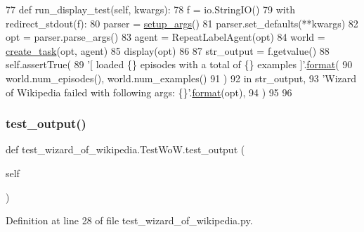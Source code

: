 \begin{DoxyCode}
77     \textcolor{keyword}{def }run\_display\_test(self, kwargs):
78         f = io.StringIO()
79         with redirect\_stdout(f):
80             parser = \hyperlink{namespaceparlai_1_1chat__service_1_1services_1_1messenger_1_1run_a17bafea2534d593de1fbf1e0724e5b67}{setup\_args}()
81             parser.set\_defaults(**kwargs)
82             opt = parser.parse\_args()
83             agent = RepeatLabelAgent(opt)
84             world = \hyperlink{namespaceparlai_1_1core_1_1worlds_a11923c10b545c7ecc1b08fe2242d9c2c}{create\_task}(opt, agent)
85             display(opt)
86 
87         str\_output = f.getvalue()
88         self.assertTrue(
89             \textcolor{stringliteral}{'[ loaded \{\} episodes with a total of \{\} examples ]'}.\hyperlink{namespaceparlai_1_1chat__service_1_1services_1_1messenger_1_1shared__utils_a32e2e2022b824fbaf80c747160b52a76}{format}(
90                 world.num\_episodes(), world.num\_examples()
91             )
92             \textcolor{keywordflow}{in} str\_output,
93             \textcolor{stringliteral}{'Wizard of Wikipedia failed with following args: \{\}'}.\hyperlink{namespaceparlai_1_1chat__service_1_1services_1_1messenger_1_1shared__utils_a32e2e2022b824fbaf80c747160b52a76}{format}(opt),
94         )
95 
96 
\end{DoxyCode}
\mbox{\label{classtest__wizard__of__wikipedia_1_1TestWoW_a5a2ccfeb297d1fa8b356bcb9c4ce2225}} 
\subsubsection{\texorpdfstring{test\+\_\+output()}{test\_output()}}
{\footnotesize\ttfamily def test\+\_\+wizard\+\_\+of\+\_\+wikipedia.\+Test\+Wo\+W.\+test\+\_\+output (\begin{DoxyParamCaption}\item[{}]{self }\end{DoxyParamCaption})}



Definition at line 28 of file test\+\_\+wizard\+\_\+of\+\_\+wikipedia.\+py.


